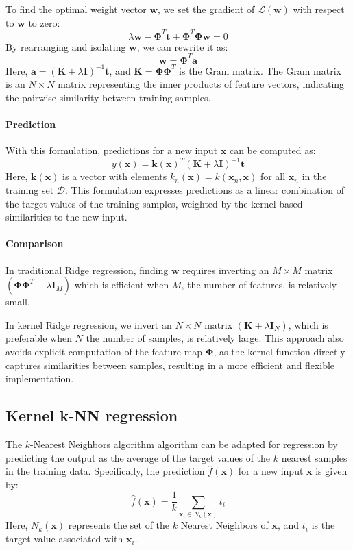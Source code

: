To find the optimal weight vector $\mathbf{w}$, we set the gradient of $\mathcal{L}(\mathbf{w})$ with respect to $\mathbf{w}$ to zero:
\[\lambda\mathbf{w}-\boldsymbol{\Phi}^T\mathbf{t}+\boldsymbol{\Phi}^T\boldsymbol{\Phi}\mathbf{w}=0\]
By rearranging and isolating $\mathbf{w}$, we can rewrite it as:
\[\mathbf{w}=\boldsymbol{\Phi}^T\mathbf{a}\]
Here, $\mathbf{a} = {\left(\mathbf{K}+\lambda \mathbf{I}\right)}^{-1}\mathbf{t}$, and $\mathbf{K}=\boldsymbol{\Phi}\boldsymbol{\Phi}^T$ is the Gram matrix.
The Gram matrix is an $N\times N$ matrix representing the inner products of feature vectors, indicating the pairwise similarity between training samples.

\paragraph*{Prediction}
With this formulation, predictions for a new input $\mathbf{x}$ can be computed as:
\[y(\mathbf{x})=\mathbf{k}{(\mathbf{x})}^T{(\mathbf{K}+\lambda\mathbf{I})}^{-1}\mathbf{t}\]
Here, $\mathbf{k}(\mathbf{x})$ is a vector with elements $k_n(\mathbf{x})=k(\mathbf{x}_n,\mathbf{x})$ for all $\mathbf{x}_n$ in the training set $\mathcal{D}$. 
This formulation expresses predictions as a linear combination of the target values of the training samples, weighted by the kernel-based similarities to the new input.

\paragraph*{Comparison}
In traditional Ridge regression, finding $\mathbf{w}$ requires inverting an $M \times M$ matrix $(\boldsymbol{\Phi}\boldsymbol{\Phi}^T+\lambda\mathbf{I}_M)$ which is efficient when $M$, the number of features, is relatively small.

In kernel Ridge regression, we invert an $N \times N$ matrix $(\mathbf{K}+\lambda\mathbf{I}_N)$, which is preferable when $N$ the number of samples, is relatively large.
This approach also avoids explicit computation of the feature map $\boldsymbol{\Phi}$, as the kernel function directly captures similarities between samples, resulting in a more efficient and flexible implementation.

\subsection{Kernel k-NN regression}
The $k$-Nearest Neighbors algorithm algorithm can be adapted for regression by predicting the output as the average of the target values of the $k$ nearest samples in the training data. 
Specifically, the prediction $\hat{f}(\mathbf{x})$ for a new input $\mathbf{x}$ is given by:
\[\hat{f}(\mathbf{x})=\dfrac{1}{k}\sum_{\mathbf{x}_i\in N_k(\mathbf{x})}t_i\]
Here, $N_k(\mathbf{x})$ represents the set of the $k$ Nearest Neighbors of $\mathbf{x}$, and $t_i$ is the target value associated with $\mathbf{x}_i$. 

